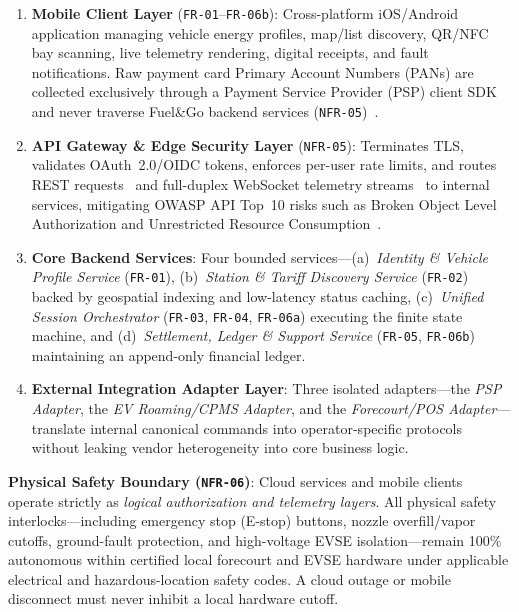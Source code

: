 \begin{enumerate}[leftmargin=1.4em, itemsep=2pt]
  \item \textbf{Mobile Client Layer} (\texttt{FR-01}--\texttt{FR-06b}): Cross-platform iOS/Android application managing vehicle energy profiles, map/list discovery, QR/NFC bay scanning, live telemetry rendering, digital receipts, and fault notifications. Raw payment card Primary Account Numbers (PANs) are collected exclusively through a Payment Service Provider (PSP) client SDK and never traverse Fuel\&Go backend services (\texttt{NFR-05})~\cite{pcissc2024pcidss401}.
  \item \textbf{API Gateway \& Edge Security Layer} (\texttt{NFR-05}): Terminates TLS, validates OAuth~2.0/OIDC tokens, enforces per-user rate limits, and routes REST requests~\cite{rfc9110} and full-duplex WebSocket telemetry streams~\cite{rfc6455} to internal services, mitigating OWASP API Top~10 risks such as Broken Object Level Authorization and Unrestricted Resource Consumption~\cite{owasp2023apitop10}.
  \item \textbf{Core Backend Services}: Four bounded services---(a)~\emph{Identity \& Vehicle Profile Service} (\texttt{FR-01}), (b)~\emph{Station \& Tariff Discovery Service} (\texttt{FR-02}) backed by geospatial indexing and low-latency status caching, (c)~\emph{Unified Session Orchestrator} (\texttt{FR-03}, \texttt{FR-04}, \texttt{FR-06a}) executing the finite state machine, and (d)~\emph{Settlement, Ledger \& Support Service} (\texttt{FR-05}, \texttt{FR-06b}) maintaining an append-only financial ledger.
  \item \textbf{External Integration Adapter Layer}: Three isolated adapters---the \emph{PSP Adapter}, the \emph{EV Roaming/CPMS Adapter}, and the \emph{Forecourt/POS Adapter}---translate internal canonical commands into operator-specific protocols without leaking vendor heterogeneity into core business logic.
\end{enumerate}

\textbf{Physical Safety Boundary (\texttt{NFR-06})}: Cloud services and mobile clients operate strictly as \emph{logical authorization and telemetry layers}. All physical safety interlocks---including emergency stop (E-stop) buttons, nozzle overfill/vapor cutoffs, ground-fault protection, and high-voltage EVSE isolation---remain 100\% autonomous within certified local forecourt and EVSE hardware under applicable electrical and hazardous-location safety codes. A cloud outage or mobile disconnect must never inhibit a local hardware cutoff.

